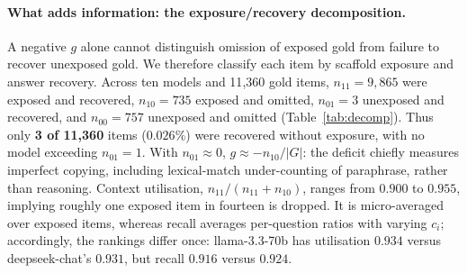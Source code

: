 \documentclass[10pt,twocolumn]{article}
\begin{document}
\paragraph{What adds information: the exposure/recovery decomposition.} A negative $g$ alone cannot distinguish omission of exposed gold from failure to recover unexposed gold. We therefore classify each item by scaffold exposure and answer recovery. Across ten models and 11{,}360 gold items, $n_{11}=9{,}865$ were exposed and recovered, $n_{10}=735$ exposed and omitted, $n_{01}=3$ unexposed and recovered, and $n_{00}=757$ unexposed and omitted (Table~\ref{tab:decomp}). Thus only \textbf{3 of 11{,}360} items ($0.026\%$) were recovered without exposure, with no model exceeding $n_{01}=1$. With $n_{01}\approx0$, $g\approx-n_{10}/|G|$: the deficit chiefly measures imperfect copying, including lexical-match under-counting of paraphrase, rather than reasoning. Context utilisation, $n_{11}/(n_{11}+n_{10})$, ranges from $0.900$ to $0.955$, implying roughly one exposed item in fourteen is dropped. It is micro-averaged over exposed items, whereas recall averages per-question ratios with varying $c_i$; accordingly, the rankings differ once: llama-3.3-70b has utilisation $0.934$ versus deepseek-chat's $0.931$, but recall $0.916$ versus $0.924$.
\end{document}
